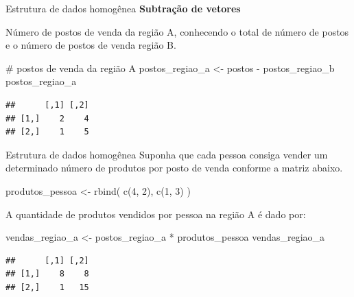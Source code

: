 \documentclass[
  10pt,
  ignorenonframetext,
]{beamer}
\newenvironment{Shaded}{}{}
\newcommand{\CommentTok}[1]{\textcolor[rgb]{0.00,0.50,0.00}{#1}}
\newcommand{\DecValTok}[1]{#1}
\newcommand{\KeywordTok}[1]{\textcolor[rgb]{0.00,0.00,1.00}{#1}}
\newcommand{\NormalTok}[1]{#1}
\newcommand{\OperatorTok}[1]{#1}
\newcommand{\StringTok}[1]{\textcolor[rgb]{0.00,0.50,0.50}{#1}}
\begin{document}
\begin{frame}[fragile]{Estrutura de dados homogênea}
\protect\hypertarget{estrutura-de-dados-homoguxeanea-14}{}
\textbf{Subtração de vetores}

Número de postos de venda da região A, conhecendo o total de número de
postos e o número de postos de venda região B.

\begin{Shaded}
\begin{Highlighting}[]
\CommentTok{\# postos de venda da região A}
\NormalTok{postos\_regiao\_a \textless{}{-}}\StringTok{ }\NormalTok{postos }\OperatorTok{{-}}\StringTok{ }\NormalTok{postos\_regiao\_b}
\NormalTok{postos\_regiao\_a}
\end{Highlighting}
\end{Shaded}

\begin{verbatim}
##      [,1] [,2]
## [1,]    2    4
## [2,]    1    5
\end{verbatim}
\end{frame}

\begin{frame}[fragile]{Estrutura de dados homogênea}
\protect\hypertarget{estrutura-de-dados-homoguxeanea-15}{}
Suponha que cada pessoa consiga vender um determinado número de produtos
por posto de venda conforme a matriz abaixo.

\begin{Shaded}
\begin{Highlighting}[]
\NormalTok{produtos\_pessoa \textless{}{-}}\StringTok{ }\KeywordTok{rbind}\NormalTok{(}
  \KeywordTok{c}\NormalTok{(}\DecValTok{4}\NormalTok{, }\DecValTok{2}\NormalTok{),}
  \KeywordTok{c}\NormalTok{(}\DecValTok{1}\NormalTok{, }\DecValTok{3}\NormalTok{)}
\NormalTok{)}
\end{Highlighting}
\end{Shaded}

A quantidade de produtos vendidos por pessoa na região A é dado por:

\begin{Shaded}
\begin{Highlighting}[]
\NormalTok{vendas\_regiao\_a \textless{}{-}}\StringTok{ }\NormalTok{postos\_regiao\_a }\OperatorTok{*}\StringTok{ }\NormalTok{produtos\_pessoa}
\NormalTok{vendas\_regiao\_a}
\end{Highlighting}
\end{Shaded}

\begin{verbatim}
##      [,1] [,2]
## [1,]    8    8
## [2,]    1   15
\end{verbatim}
\end{frame}
\end{document}
